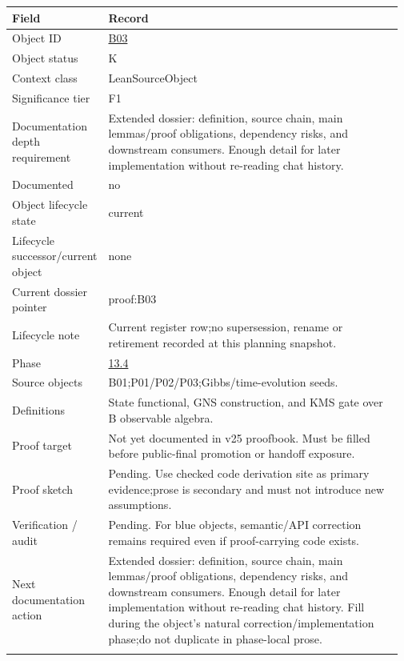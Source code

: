 \begin{longtable}{L{0.16\linewidth} L{0.81\linewidth}}
\hline
\textbf{Field} & \textbf{Record}\\
\hline
Object ID & \hyperlink{object-row-B03}{B03}\\
\hline\addlinespace[0.20em]
Object status & K\\
\hline\addlinespace[0.20em]
Context class & LeanSourceObject\\
\hline\addlinespace[0.20em]
Significance tier & F1\\
\hline\addlinespace[0.20em]
Documentation depth requirement & Extended dossier: definition, source chain, main lemmas/\allowbreak{}proof obligations, dependency risks, and downstream consumers. Enough detail for later implementation without re-reading chat history.\\
\hline\addlinespace[0.20em]
Documented & no\\
\hline\addlinespace[0.20em]
Object lifecycle state & current\\
\hline\addlinespace[0.20em]
Lifecycle successor/\allowbreak{}current object & none\\
\hline\addlinespace[0.20em]
Current dossier pointer & proof:B03\\
\hline\addlinespace[0.20em]
Lifecycle note & Current register row;\newline no supersession, rename or retirement recorded at this planning snapshot.\\
\hline\addlinespace[0.20em]
Phase & \hyperlink{phase-row-13-4}{13.4}\\
\hline\addlinespace[0.20em]
Source objects & B01;\newline P01/\allowbreak{}P02/\allowbreak{}P03;\newline Gibbs/\allowbreak{}time-evolution seeds.\\
\hline\addlinespace[0.20em]
Definitions & State functional, GNS construction, and KMS gate over B observable algebra.\\
\hline\addlinespace[0.20em]
Proof target & Not yet documented in v25 proofbook. Must be filled before public-final promotion or handoff exposure.\\
\hline\addlinespace[0.20em]
Proof sketch & Pending. Use checked code derivation site as primary evidence;\newline prose is secondary and must not introduce new assumptions.\\
\hline\addlinespace[0.20em]
Verification /\allowbreak{} audit & Pending. For blue objects, semantic/\allowbreak{}API correction remains required even if proof-carrying code exists.\\
\hline\addlinespace[0.20em]
Next documentation action & Extended dossier: definition, source chain, main lemmas/\allowbreak{}proof obligations, dependency risks, and downstream consumers. Enough detail for later implementation without re-reading chat history. Fill during the object's natural correction/\allowbreak{}implementation phase;\newline do not duplicate in phase-local prose.\\
\hline\addlinespace[0.20em]
\end{longtable}
